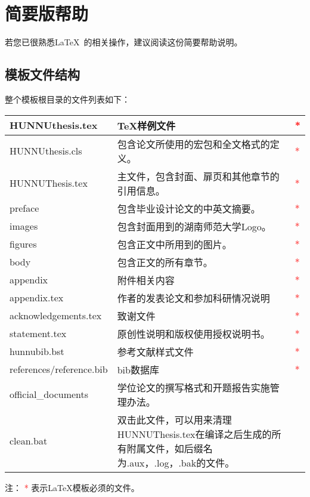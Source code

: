 \chapter{简要版帮助}
若您已很熟悉\LaTeX~的相关操作，建议阅读这份简要帮助说明。
\section{模板文件结构\label{sec:files}}
整个模板根目录的文件列表如下：
\begin{center}
	\begin{tabular}{|l|p{7.5cm}|l|}
		\hline
		HUNNUthesis.tex          &\TeX{}样例文件             & \textcolor{red}{{*}} \\
		\hline
		HUNNUthesis.cls&包含论文所使用的宏包和全文格式的定义。& \textcolor{red}{{*}} \\
		\hline
		HUNNUThesis.tex& 主文件，包含封面、扉页和其他章节的引用信息。& \textcolor{red}{{*}} \\
		\hline
		preface& 包含毕业设计论文的中英文摘要。& \textcolor{red}{{*}} \\
		\hline
		images& 包含封面用到的湖南师范大学Logo。& \textcolor{red}{{*}} \\
		\hline
		figures& 包含正文中所用到的图片。& \textcolor{red}{{*}} \\
		\hline
		body& 包含正文的所有章节。& \textcolor{red}{{*}} \\
		\hline
		appendix& 附件相关内容& \textcolor{red}{{*}} \\
		\hline
		appendix.tex & 作者的发表论文和参加科研情况说明& \textcolor{red}{{*}} \\
		\hline
		acknowledgements.tex&致谢文件& \textcolor{red}{{*}} \\
		\hline
		statement.tex&原创性说明和版权使用授权说明书。& \textcolor{red}{{*}} \\
		\hline
		hunnubib.bst             & 参考文献样式文件               & \textcolor{red}{{*}} \\
		\hline
		references/reference.bib & bib数据库                  & \textcolor{red}{{*}} \\
		\hline
		official\_documents& 学位论文的撰写格式和开题报告实施管理办法。& \\
		\hline
		clean.bat& 双击此文件，可以用来清理HUNNUThesis.tex在编译之后生成的所有附属文件，如后缀名为.aux，.log，.bak的文件。&  \\
		\hline
	\end{tabular}
\end{center}
注： \textcolor{red}{{*}} 表示\LaTeX{}模板必须的文件。

